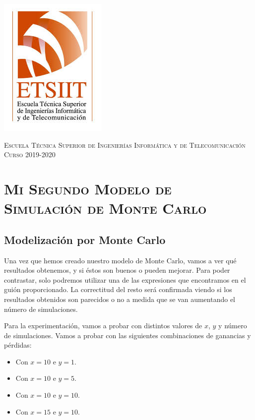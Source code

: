 \documentclass[11pt,a4paper]{report}
\begin{document}
\begin{titlepage}
\begin{minipage}{\textwidth}
\includegraphics[scale=0.3]{img/etsiit.jpeg}

\vspace{0.7cm}
\textsc{Escuela Técnica Superior de Ingenierías Informática y de Telecomunicación}\\
\vspace{1cm}
\textsc{Curso 2019-2020}
\end{minipage}
\end{titlepage}

\tableofcontents
\thispagestyle{empty}				%

\newpage

\setlength{\parskip}{1em}

\chapter{\textsc{Mi Segundo Modelo de Simulación de Monte Carlo}}

\section{Modelización por Monte Carlo}

Una vez que hemos creado nuestro modelo de Monte Carlo, vamos a ver qué resultados obtenemos, y si éstos son buenos o pueden mejorar.
Para poder contrastar, solo podremos utilizar una de las expresiones que encontramos en el guión proporcionado. La correctitud
del resto será confirmada viendo si los resultados obtenidos son parecidos o no a medida que se van aumentando el número de
simulaciones.

Para la experimentación, vamos a probar con distintos valores de $x$, $y$ y número de simulaciones.
Vamos a probar con las siguientes combinaciones de ganancias y pérdidas:

\begin{itemize}
	\item Con $x = 10$ e $y = 1$.
	\item Con $x = 10$ e $y = 5$.
	\item Con $x = 10$ e $y = 10$.
	\item Con $x = 15$ e $y = 10$.
\end{itemize}
\end{document}
